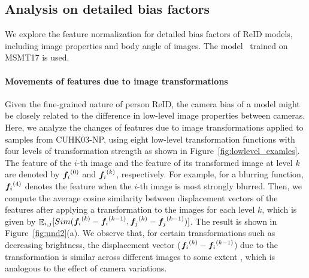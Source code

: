 \subsection{Analysis on detailed bias factors}

We explore the feature normalization for detailed bias factors of ReID models, including image properties and body angle of images.
The model~\citep{luo2021self} trained on MSMT17 is used.

\paragraph{Movements of features due to image transformations}
Given the fine-grained nature of person ReID, the camera bias of a model might be closely related to the difference in low-level image properties between cameras.
Here, we analyze the changes of features due to image transformations applied to samples from CUHK03-NP, using eight low-level transformation functions with four levels of transformation strength as shown in Figure~\ref{fig:lowlevel_examles}.
The feature of the $i$-th image and the feature of its transformed image at level $k$ are denoted by ${\bm{f}_i}^{(0)}$ and ${\bm{f}_i}^{(k)}$, respectively.
For example, for a blurring function, ${\bm{f}_i}^{(4)}$ denotes the feature when the $i$-th image is most strongly blurred.
Then, we compute the average cosine similarity between displacement vectors of the features after applying a transformation to the images for each level $k$, which is given by $\mathop{\mathbb{E}}_{i,j} [Sim({\bm{f}_i}^{(k)} - {\bm{f}_i}^{(k-1)}, {\bm{f}_j}^{(k)} - {\bm{f}_j}^{(k-1)})]$.
The result is shown in Figure~\ref{fig:und2}(a).
We observe that, for certain transformations such as decreasing brightness, 
the displacement vector (${\bm{f}_i}^{(k)} - {\bm{f}_i}^{(k-1)}$) due to the transformation is similar across different images to some extent
, which is analogous to the effect of camera variations.

